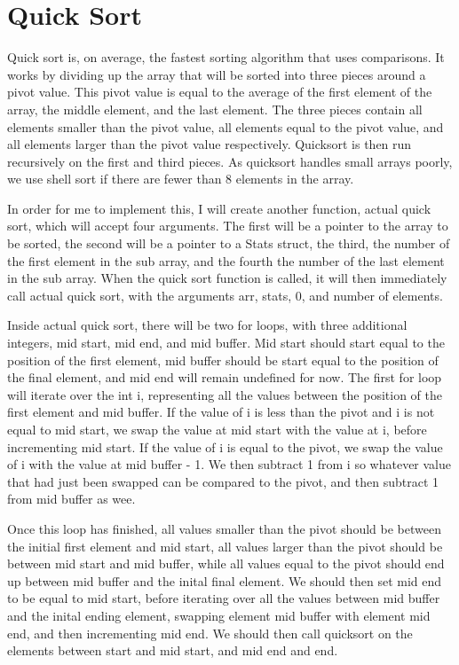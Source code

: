 \documentclass[11pt]{article}
\begin{document}
\section{Quick Sort}

Quick sort is, on average, the fastest sorting algorithm that uses comparisons. It works by dividing up the array that will be sorted into three pieces around a pivot value. This pivot value is equal to the average of the first element of the array, the middle element, and the last element. The three pieces contain all elements smaller than the pivot value, all elements equal to the pivot value, and all elements larger than the pivot value respectively. Quicksort is then run recursively on the first and third pieces. As quicksort handles small arrays poorly, we use shell sort if there are fewer than 8 elements in the array.

In order for me to implement this, I will create another function, actual quick sort, which will accept four arguments. The first will be a pointer to the array to be sorted, the second will be a pointer to a Stats struct, the third, the number of the first element in the sub array, and the fourth the number of the last element in the sub array. When the quick sort function is called, it will then immediately call actual quick sort, with the arguments arr, stats, 0, and number of elements.

Inside actual quick sort, there will be two for loops, with three additional integers, mid start, mid end, and mid buffer. Mid start should start equal to the position of the first element, mid buffer should be start equal to the position of the final element, and mid end will remain undefined for now. The first for loop will iterate over the int i, representing all the values between the position of the first element and mid buffer. If the value of i is less than the pivot and i is not equal to mid start, we swap the value at mid start with the value at i, before incrementing mid start. If the value of i is equal to the pivot, we swap the value of i with the value at mid buffer - 1. We then subtract 1 from i so whatever value that had just been swapped can be compared to the pivot, and then subtract 1 from mid buffer as wee. 

Once this loop has finished, all values smaller than the pivot should be between the initial first element and mid start, all values larger than the pivot should be between mid start and mid buffer, while all values equal to the pivot should end up between mid buffer and the inital final element. We should then set mid end to be equal to mid start, before iterating over all the values between mid buffer and the inital ending element, swapping element mid buffer with element mid end, and then incrementing mid end. We should then call quicksort on the elements between start and mid start, and mid end and end.
\end{document}
